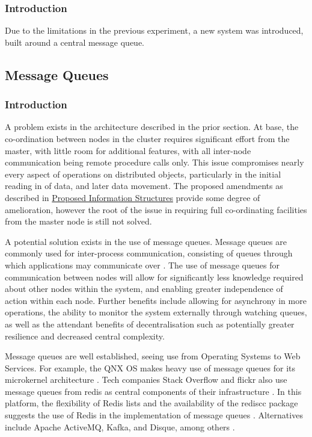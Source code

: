 \subsubsection{Introduction}\label{mqintro}

Due to the limitations in the previous experiment, a new system was introduced, built around a central message queue.

\subsection{Message Queues}
\hypertarget{introduction}{%
\subsubsection{Introduction}\label{introduction}}

A problem exists in the architecture described in the prior section.
At base, the co-ordination between nodes in the
cluster requires significant effort from the master, with little room
for additional features, with all inter-node communication being remote
procedure calls only. This issue compromises nearly every aspect of
operations on distributed objects, particularly in the initial reading
in of data, and later data movement. The proposed amendments as
described in \href{current-proposed-info-structures.html}{Proposed
Information Structures} provide some degree of amelioration, however the
root of the issue in requiring full co-ordinating facilities from the
master node is still not solved.

A potential solution exists in the use of message queues. Message queues
are commonly used for inter-process communication, consisting of queues
through which applications may communicate over \cite{curry2004message}.
The use of message queues for communication between nodes will allow for
significantly less knowledge required about other nodes within the
system, and enabling greater independence of action within each node.
Further benefits include allowing for asynchrony in more operations, the
ability to monitor the system externally through watching queues, as
well as the attendant benefits of decentralisation such as potentially
greater resilience and decreased central complexity.

Message queues are well established, seeing use from Operating Systems
to Web Services. For example, the QNX OS makes heavy use of message
queues for its microkernel architecture \cite{hildebrand1992qnx}. Tech
companies Stack Overflow and flickr also use message queues from redis
as central components of their infrastructure \cite{nolan2011flickr}
\cite{montrose2016stack}. In this platform, the flexibility of Redis lists
and the availability of the rediscc package suggests the use of Redis in
the implementation of message queues \cite{sanfilippo2009redis}
\cite{urbanek2020rediscc}. Alternatives include Apache ActiveMQ, Kafka, and
Disque, among others \cite{snyder2011activemq}\cite{garg2013kafka}
\cite{sanfilippo2016disque}.


